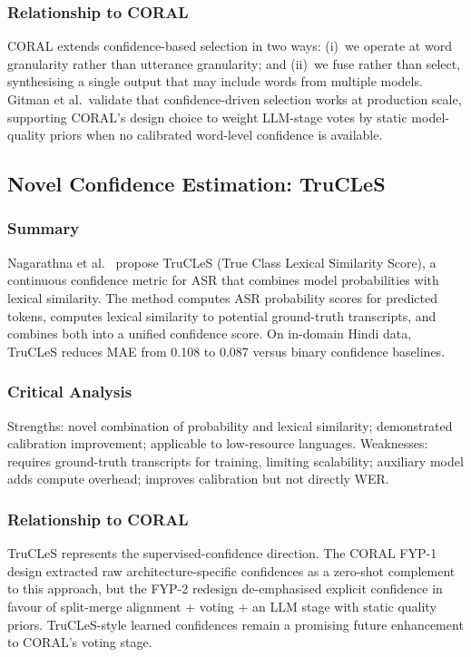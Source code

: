 \subsubsection{Relationship to CORAL}
CORAL extends confidence-based selection in two ways: (i)~we operate at word granularity rather than utterance granularity; and (ii)~we fuse rather than select, synthesising a single output that may include words from multiple models. Gitman et al.\ validate that confidence-driven selection works at production scale, supporting CORAL's design choice to weight LLM-stage votes by static model-quality priors when no calibrated word-level confidence is available.

\subsection{Novel Confidence Estimation: TruCLeS}
\label{ssec:lit-trucles}

\subsubsection{Summary}
Nagarathna et al.~\cite{trucles2025} propose TruCLeS (True Class Lexical Similarity Score), a continuous confidence metric for ASR that combines model probabilities with lexical similarity. The method computes ASR probability scores for predicted tokens, computes lexical similarity to potential ground-truth transcripts, and combines both into a unified confidence score. On in-domain Hindi data, TruCLeS reduces MAE from 0.108 to 0.087 versus binary confidence baselines.

\subsubsection{Critical Analysis}
Strengths: novel combination of probability and lexical similarity; demonstrated calibration improvement; applicable to low-resource languages. Weaknesses: requires ground-truth transcripts for training, limiting scalability; auxiliary model adds compute overhead; improves calibration but not directly WER.

\subsubsection{Relationship to CORAL}
TruCLeS represents the supervised-confidence direction. The CORAL FYP-1 design extracted raw architecture-specific confidences as a zero-shot complement to this approach, but the FYP-2 redesign de-emphasised explicit confidence in favour of split-merge alignment + voting + an LLM stage with static quality priors. TruCLeS-style learned confidences remain a promising future enhancement to CORAL's voting stage.

